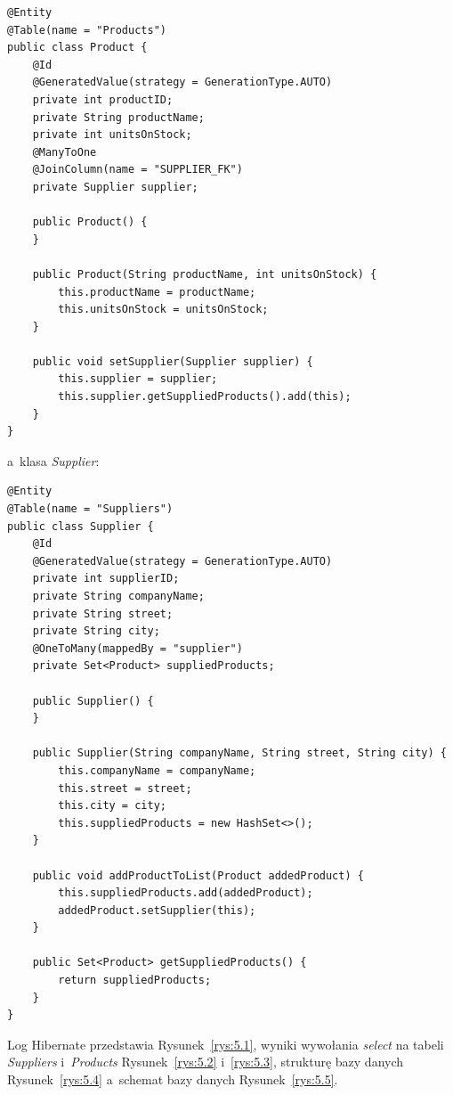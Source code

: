 \documentclass[12pt, a4paper]{mwart}
\begin{document}
\begin{lstlisting}
@Entity
@Table(name = "Products")
public class Product {
    @Id
    @GeneratedValue(strategy = GenerationType.AUTO)
    private int productID;
    private String productName;
    private int unitsOnStock;
    @ManyToOne
    @JoinColumn(name = "SUPPLIER_FK")
    private Supplier supplier;

    public Product() {
    }

    public Product(String productName, int unitsOnStock) {
        this.productName = productName;
        this.unitsOnStock = unitsOnStock;
    }

    public void setSupplier(Supplier supplier) {
        this.supplier = supplier;
        this.supplier.getSuppliedProducts().add(this);
    }
}
\end{lstlisting}

a~klasa \textit{Supplier}:

\begin{lstlisting}
@Entity
@Table(name = "Suppliers")
public class Supplier {
    @Id
    @GeneratedValue(strategy = GenerationType.AUTO)
    private int supplierID;
    private String companyName;
    private String street;
    private String city;
    @OneToMany(mappedBy = "supplier")
    private Set<Product> suppliedProducts;

    public Supplier() {
    }

    public Supplier(String companyName, String street, String city) {
        this.companyName = companyName;
        this.street = street;
        this.city = city;
        this.suppliedProducts = new HashSet<>();
    }

    public void addProductToList(Product addedProduct) {
        this.suppliedProducts.add(addedProduct);
        addedProduct.setSupplier(this);
    }

    public Set<Product> getSuppliedProducts() {
        return suppliedProducts;
    }
}
\end{lstlisting}

Log Hibernate przedstawia Rysunek~\ref{rys:5.1}, wyniki wywołania \textit{select} na tabeli \textit{Suppliers} i~\textit{Products} Rysunek~\ref{rys:5.2} i~\ref{rys:5.3}, strukturę bazy danych Rysunek~\ref{rys:5.4} a~schemat bazy danych Rysunek~\ref{rys:5.5}.
\end{document}

